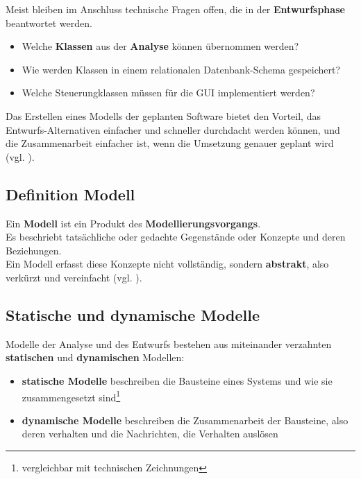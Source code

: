 \noindent
Meist bleiben im Anschluss technische Fragen offen, die in der \textbf{Entwurfsphase} beantwortet werden.

\begin{itemize}
    \item Welche \textbf{Klassen} aus der \textbf{Analyse} können übernommen werden?
    \item Wie werden Klassen in einem relationalen Datenbank-Schema gespeichert?
    \item Welche Steuerungklassen müssen für die GUI implementiert werden?
\end{itemize}

\noindent
Das Erstellen eines Modells der geplanten Software bietet den Vorteil, das Entwurfs-Alternativen einfacher und schneller durchdacht werden können, und die Zusammenarbeit einfacher ist, wenn die Umsetzung genauer geplant wird (vgl. \cite[2]{Wed09b}).


\subsection*{Definition Modell}


\vspace{2mm}
\begin{tcolorbox}[title=Arbeitsdefinition ``Modell``]
    Ein \textbf{Modell} ist ein Produkt des \textbf{Modellierungsvorgangs}.\\

    \noindent
    Es beschriebt tatsächliche oder gedachte Gegenstände oder Konzepte und deren Beziehungen.\\

    \noindent
    Ein Modell erfasst diese Konzepte nicht vollständig, sondern \textbf{abstrakt}, also verkürzt und vereinfacht (vgl. \cite[2]{Wed09b}).
\end{tcolorbox}
\vspace{2mm}

\subsection*{Statische und dynamische Modelle}

\noindent
Modelle der Analyse und des Entwurfs bestehen aus miteinander verzahnten \textbf{statischen} und \textbf{dynamischen} Modellen:

\begin{itemize}
    \item \textbf{statische Modelle} beschreiben die Bausteine eines Systems und wie sie zusammengesetzt sind\footnote{vergleichbar mit technischen Zeichnungen}
    \item \textbf{dynamische Modelle} beschreiben die Zusammenarbeit der Bausteine, also deren verhalten und die Nachrichten, die Verhalten auslösen
\end{itemize}


